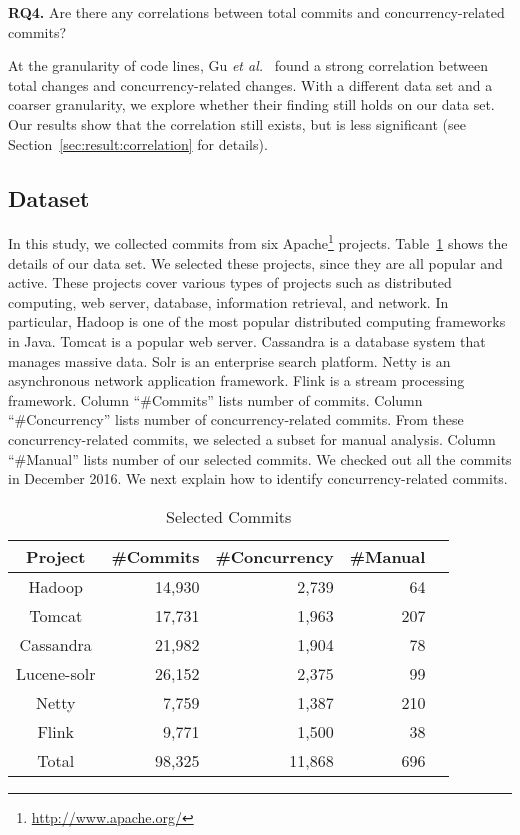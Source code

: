 \textbf{RQ4.} Are there any correlations between total commits and concurrency-related commits?

At the granularity of code lines, Gu \emph{et al.}~\cite{conf/sigsoft/GuJSZL15} found a strong correlation between total changes and concurrency-related changes. With a different data set and a coarser granularity, we explore whether their finding still holds on our data set. Our results show that the correlation still exists, but is less significant (see Section~\ref{sec:result:correlation} for details).

\subsection{Dataset}
\label{sec:method:data}
In this study, we collected commits from six Apache\footnote{\url{http://www.apache.org/}} projects. Table~\ref{table:dataset} shows the details of our data set. We selected these projects, since they are all popular and active. These projects cover various types of projects such as distributed computing, web server, database, information retrieval, and network. In particular, Hadoop is one of the most popular distributed computing frameworks in Java. Tomcat is a popular web server. Cassandra is a database system that manages massive data. Solr is an enterprise search platform. Netty is an asynchronous network application framework. Flink is a stream processing framework. Column ``\#Commits'' lists number of commits. Column ``\#Concurrency'' lists number of concurrency-related commits. From these concurrency-related commits, we selected a subset for manual analysis. Column ``\#Manual'' lists number of our selected commits. We checked out all the commits in December 2016. We next explain how to identify concurrency-related commits.

\begin{table}
	\centering
	\caption{Selected Commits}\vspace*{-2ex}
    \label{table:dataset}
	\begin{tabular}{|c|r|r|r|r|}\hline
		Project&\#Commits&\#Concurrency&\#Manual\\\hline
		Hadoop&14,930&2,739&64\\
		Tomcat&17,731&1,963&207\\
		Cassandra&21,982&1,904&78\\
		Lucene-solr&26,152&2,375&99\\
		Netty&7,759&1,387&210\\
		Flink&9,771&1,500&38\\\hline
		Total&98,325&11,868&696\\\hline
	\end{tabular}\vspace*{-3ex}
\end{table}

